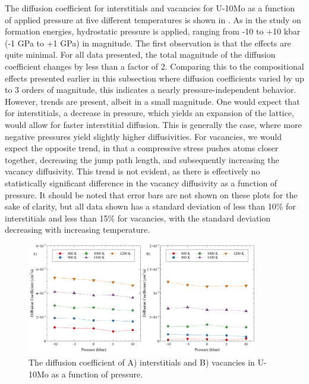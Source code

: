 \documentclass[review]{elsarticle}
\begin{document}
The diffusion coefficient for interstitials and vacancies for U-10Mo as a function of applied pressure at five different temperatures is shown in . As in the study on formation energies, hydrostatic pressure is applied, ranging from -10 to +10 kbar (-1 GPa to +1 GPa) in magnitude. The first observation is that the effects are quite minimal. For all data presented, the total magnitude of the diffusion coefficient changes by less than a factor of 2. Comparing this to the compositional effects presented earlier in this subsection where diffusion coefficients varied by up to 3 orders of magnitude, this indicates a nearly pressure-independent behavior. However, trends are present, albeit in a small magnitude. One would expect that for interstitials, a decrease in pressure, which yields an expansion of the lattice, would allow for faster interstitial diffusion. This is generally the case, where more negative pressures yield slightly higher diffusivities. For vacancies, we would expect the opposite trend, in that a compressive stress pushes atoms closer together, decreasing the jump path length, and subsequently increasing the vacancy diffusivity. This trend is not evident, as there is effectively no statistically significant difference in the vacancy diffusivity as a function of pressure. It should be noted that error bars are not shown on these plots for the sake of clarity, but all data shown has a standard deviation of less than 10\% for interstitials and less than 15\% for vacancies, with the standard deviation decreasing with increasing temperature. 

\begin{figure}[h!]
    \centering
    \includegraphics[width=0.9\textwidth]{int_vac_p.pdf}
    \caption{The diffusion coefficient of A) interstitials and B) vacancies in U-10Mo as a function of pressure.}
    \label{fig:int_vac_p}
\end{figure}
\end{document}
